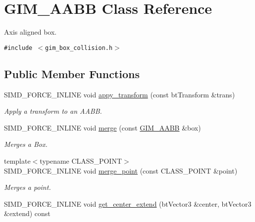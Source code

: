 \hypertarget{class_g_i_m___a_a_b_b}{
\section{GIM\_\-AABB Class Reference}
\label{class_g_i_m___a_a_b_b}
}
Axis aligned box.  


{\tt \#include $<$gim\_\-box\_\-collision.h$>$}

\subsection*{Public Member Functions}
\begin{CompactItemize}
\item 
\hypertarget{class_g_i_m___a_a_b_b_deb95bf6a8b4d0281b35adf33fbbfbdc}{
SIMD\_\-FORCE\_\-INLINE void \hyperlink{class_g_i_m___a_a_b_b_deb95bf6a8b4d0281b35adf33fbbfbdc}{appy\_\-transform} (const btTransform \&trans)}
\label{class_g_i_m___a_a_b_b_deb95bf6a8b4d0281b35adf33fbbfbdc}

\begin{CompactList}\small\item\em Apply a transform to an AABB. \item\end{CompactList}\item 
\hypertarget{class_g_i_m___a_a_b_b_75e41aceb9b1e8f4b90e702dcec19c13}{
SIMD\_\-FORCE\_\-INLINE void \hyperlink{class_g_i_m___a_a_b_b_75e41aceb9b1e8f4b90e702dcec19c13}{merge} (const \hyperlink{class_g_i_m___a_a_b_b}{GIM\_\-AABB} \&box)}
\label{class_g_i_m___a_a_b_b_75e41aceb9b1e8f4b90e702dcec19c13}

\begin{CompactList}\small\item\em Merges a Box. \item\end{CompactList}\item 
\hypertarget{class_g_i_m___a_a_b_b_435ac5e5cacf99c60baf01f9a113a798}{
{\footnotesize template$<$typename CLASS\_\-POINT$>$ }\\SIMD\_\-FORCE\_\-INLINE void \hyperlink{class_g_i_m___a_a_b_b_435ac5e5cacf99c60baf01f9a113a798}{merge\_\-point} (const CLASS\_\-POINT \&point)}
\label{class_g_i_m___a_a_b_b_435ac5e5cacf99c60baf01f9a113a798}

\begin{CompactList}\small\item\em Merges a point. \item\end{CompactList}\item 
\hypertarget{class_g_i_m___a_a_b_b_75140c87ffca65c98ae0391161768ecf}{
SIMD\_\-FORCE\_\-INLINE void \hyperlink{class_g_i_m___a_a_b_b_75140c87ffca65c98ae0391161768ecf}{get\_\-center\_\-extend} (btVector3 \&center, btVector3 \&extend) const }
\label{class_g_i_m___a_a_b_b_75140c87ffca65c98ae0391161768ecf}


\end{CompactItemize}
